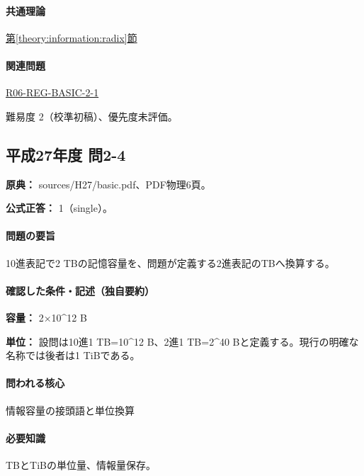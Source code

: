 \paragraph{共通理論} \hyperref[theory:information:radix]{第\ref*{theory:information:radix}節}

\paragraph{関連問題} \hyperref[q:r06-reg-basic-2-1]{R06-REG-BASIC-2-1}

\par 難易度 2（校準初稿）、優先度未評価。

\subsection{平成27年度 問2-4}
\label{q:h27-reg-basic-2-4}

\noindent\textbf{原典：} sources/H27/basic.pdf、PDF物理6頁。

\textbf{公式正答：} 1（single）。

\paragraph{問題の要旨} 10進表記で2 TBの記憶容量を、問題が定義する2進表記のTBへ換算する。

\paragraph{確認した条件・記述（独自要約）}\mbox{}\par

\noindent\textbf{容量：} 2×10\textasciicircum{}12 B\par

\noindent\textbf{単位：} 設問は10進1 TB=\allowbreak{}10\textasciicircum{}12 B、2進1 TB=\allowbreak{}2\textasciicircum{}40 Bと定義する。現行の明確な名称では後者は1 TiBである。\par

\paragraph{問われる核心} 情報容量の接頭語と単位換算

\paragraph{必要知識} TBとTiBの単位量、情報量保存。

